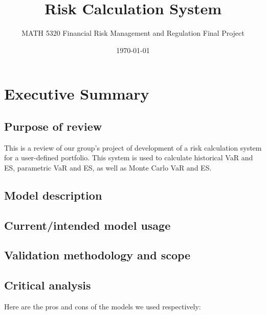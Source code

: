 \documentclass[letterpaper,11pt, oneside]{layout}
\title{Risk Calculation System}
\subtitle{MATH 5320 Financial Risk Management and Regulation Final Project}
\date{\today}
\begin{document}
\cleardoublepage
\maketitle

\frontmatter
\begin{spacing}{1}
%

\tableofcontents
\listoffigures
\listoftables
\end{spacing}


\mainmatter

\chapter{Executive Summary}
\label{chap:summ}

\section{Purpose of review}
\label{sec:summ:pr}

This is a review of our group’s project of development of a risk calculation system for a user-defined portfolio. This system is used to calculate historical VaR and ES, parametric VaR and ES, as well as Monte Carlo VaR and ES.

\section{Model description}
\label{sec:summ:md}

\section{Current/intended model usage}
\label{sec:summ:mu}

\section{Validation methodology and scope}
\label{sec:summ:vms}

\section{Critical analysis}
\label{sec:summ:ca}

Here are the pros and cons of the models we used respectively:
\end{document}
